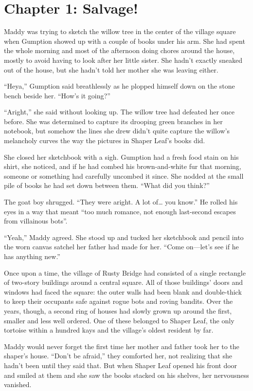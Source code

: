 \documentclass[10pt]{article}
\begin{document}
\section{Chapter 1: Salvage!}

Maddy was trying to sketch the willow tree in the center of the village
square when Gumption showed up with a couple of books under his arm. She
had spent the whole morning and most of the afternoon doing chores
around the house, mostly to avoid having to look after her little
sister. She hadn't exactly sneaked out of the house, but she hadn't told
her mother she was leaving either.

``Heya,'' Gumption said breathlessly as he plopped himself down on the
stone bench beside her. ``How's it going?''

``Aright,'' she said without looking up. The willow tree had defeated
her once before. She was determined to capture its drooping green
branches in her notebook, but somehow the lines she drew didn't quite
capture the willow's melancholy curves the way the pictures in Shaper
Leaf's books did.

She closed her sketchbook with a sigh. Gumption had a fresh food stain
on his shirt, she noticed, and if he had combed his brown-and-white fur
that morning, someone or something had carefully uncombed it since. She
nodded at the small pile of books he had set down between them. ``What
did you think?''

The goat boy shrugged. ``They were aright. A lot of\ldots{} you know.''
He rolled his eyes in a way that meant ``too much romance, not enough
last-second escapes from villainous bots''.

``Yeah,'' Maddy agreed. She stood up and tucked her sketchbook and
pencil into the worn canvas satchel her father had made for her. ``Come
on---let's see if he has anything new.''

Once upon a time, the village of Rusty Bridge had consisted of a single
rectangle of two-story buildings around a central square. All of those
buildings' doors and windows had faced the square: the outer walls had
been blank and double-thick to keep their occupants safe against rogue
bots and roving bandits. Over the years, though, a second ring of houses
had slowly grown up around the first, smaller and less well ordered. One
of these belonged to Shaper Leaf, the only tortoise within a hundred
kays and the village's oldest resident by far.

Maddy would never forget the first time her mother and father took her
to the shaper's house. ``Don't be afraid,'' they comforted her, not
realizing that she hadn't been until they said that. But when Shaper
Leaf opened his front door and smiled at them and she saw the books
stacked on his shelves, her nervousness vanished.
\end{document}
